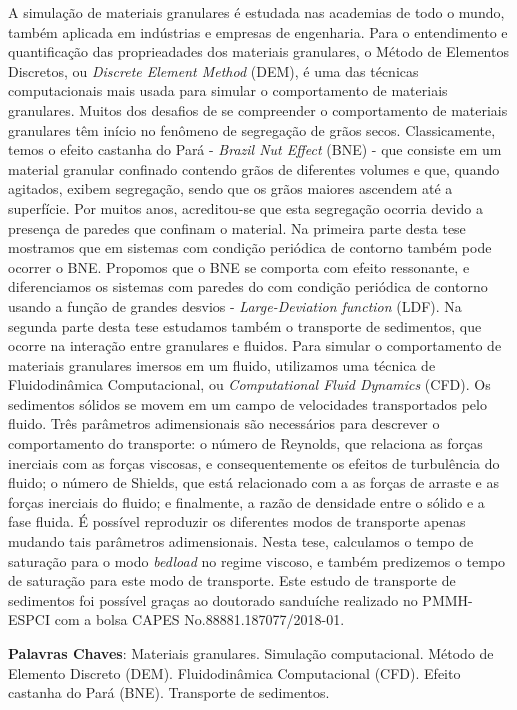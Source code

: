 
\begin{resumo}
    A simulação de materiais granulares é estudada nas academias de todo o mundo, também aplicada em indústrias e empresas de engenharia. Para o entendimento e quantificação das proprieadades dos materiais granulares, o Método de Elementos Discretos, ou \textit{Discrete Element Method} (DEM), é uma das técnicas computacionais mais usada para simular o comportamento de materiais granulares.
    Muitos dos desafios de se compreender o comportamento de materiais granulares têm início no fenômeno de segregação de grãos secos. Classicamente, temos o efeito castanha do Pará - \textit{Brazil Nut Effect} (BNE) - que consiste em um material granular confinado contendo grãos de diferentes volumes e que, quando agitados, exibem segregação, sendo que os grãos maiores ascendem até a superfície. Por muitos anos, acreditou-se que esta segregação ocorria devido a presença de paredes que confinam o material. Na primeira parte desta tese mostramos que em sistemas com condição periódica de contorno também pode ocorrer o BNE. Propomos que o BNE se comporta com efeito ressonante, e diferenciamos os sistemas com paredes do com condição periódica de contorno usando a função de grandes desvios - \textit{Large-Deviation function} (LDF).
    Na segunda parte desta tese estudamos também o transporte de sedimentos, que ocorre na interação entre granulares e fluidos. Para simular o comportamento de materiais granulares imersos em um fluido, utilizamos uma técnica de Fluidodinâmica Computacional, ou \textit{Computational Fluid Dynamics} (CFD). Os sedimentos sólidos se movem em um campo de velocidades transportados pelo fluido. Três parâmetros adimensionais são necessários para descrever o comportamento do transporte: o número de Reynolds, que relaciona as forças inerciais com as forças viscosas, e consequentemente os efeitos de turbulência do fluido; o número de Shields, que está relacionado com a as forças de arraste e as forças inerciais do fluido; e finalmente, a razão de densidade entre o sólido e a fase fluida. É possível reproduzir os diferentes modos de transporte apenas mudando tais parâmetros adimensionais. Nesta tese, calculamos o tempo de saturação para o modo \textit{bedload} no regime viscoso, e também predizemos o tempo de saturação para este modo de transporte. Este estudo de transporte de sedimentos foi possível graças ao doutorado sanduíche realizado no PMMH-ESPCI com a bolsa CAPES No.88881.187077/2018-01.

    \textbf{Palavras Chaves}: Materiais granulares. Simulação computacional. Método de Elemento Discreto (DEM). Fluidodinâmica Computacional (CFD). Efeito castanha do Pará (BNE). Transporte de sedimentos.

\end{resumo}
